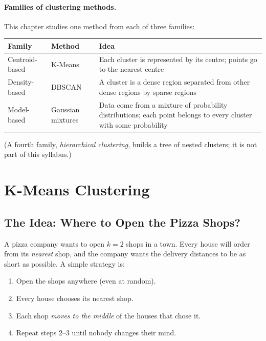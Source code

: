 \paragraph{Families of clustering methods.} This chapter studies one method from each of three families:

\begin{center}
\begin{tabular}{@{}p{3.3cm}p{4.2cm}p{6cm}@{}}
\toprule
\textbf{Family} & \textbf{Method} & \textbf{Idea}\\
\midrule
Centroid-based & K-Means & Each cluster is represented by its centre; points go to the nearest centre\\
Density-based & DBSCAN & A cluster is a dense region separated from other dense regions by sparse regions\\
Model-based & Gaussian mixtures & Data come from a mixture of probability distributions; each point belongs to every cluster with some probability\\
\bottomrule
\end{tabular}
\end{center}

\noindent (A fourth family, \emph{hierarchical clustering}, builds a tree of nested clusters; it is not part of this syllabus.)

\section{K-Means Clustering}

\subsection{The Idea: Where to Open the Pizza Shops?}

A pizza company wants to open $k=2$ shops in a town. Every house will order from its \emph{nearest} shop, and the company wants the delivery distances to be as short as possible. A simple strategy is:

\begin{enumerate}
  \item Open the shops anywhere (even at random).
  \item Every house chooses its nearest shop.
  \item Each shop \emph{moves to the middle} of the houses that chose it.
  \item Repeat steps 2--3 until nobody changes their mind.
\end{enumerate}

